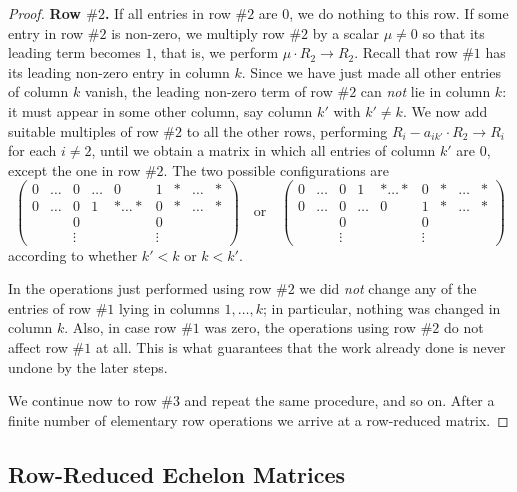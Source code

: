 \begin{proof}
\textbf{Row $\#2$.} If all entries in row $\#2$ are $0$, we do nothing to this row. If some entry in row $\#2$ is non-zero, we multiply row $\#2$ by a scalar $\mu \ne 0$ so that its leading term becomes $1$, that is, we perform $\mu \cdot R_2 \to R_2$. Recall that row $\#1$ has its leading non-zero entry in column $k$. Since we have just made all other entries of column $k$ vanish, the leading non-zero term of row $\#2$ can \emph{not} lie in column $k$: it must appear in some other column, say column $k'$ with $k' \ne k$. We now add suitable multiples of row $\#2$ to all the other rows, performing $R_i - a_{ik'} \cdot R_2 \to R_i$ for each $i \ne 2$, until we obtain a matrix in which all entries of column $k'$ are $0$, except the one in row $\#2$. The two possible configurations are
\[
\begin{pmatrix}
0 & \dots & 0 & \dots & 0 & 1 & \ast & \dots & \ast \\
0 & \dots & 0 & 1 & \ast \dots \ast & 0 & \ast & \dots & \ast \\
& & 0 & & & 0 & & & \\
& & \vdots & & & \vdots & & &
\end{pmatrix}
\quad \text{or} \quad
\begin{pmatrix}
0 & \dots & 0 & 1 & \ast \dots \ast & 0 & \ast & \dots & \ast \\
0 & \dots & 0 & \dots & 0 & 1 & \ast & \dots & \ast \\
& & 0 & & & 0 & & & \\
& & \vdots & & & \vdots & & &
\end{pmatrix}
\]
according to whether $k' < k$ or $k < k'$.

\begin{importantremark}
\label{rem:row_reduction_does_not_undo}
In the operations just performed using row $\#2$ we did \emph{not} change any of the entries of row $\#1$ lying in columns $1, \dots, k$; in particular, nothing was changed in column $k$. Also, in case row $\#1$ was zero, the operations using row $\#2$ do not affect row $\#1$ at all. This is what guarantees that the work already done is never undone by the later steps.
\end{importantremark}

We continue now to row $\#3$ and repeat the same procedure, and so on. After a finite number of elementary row operations we arrive at a row-reduced matrix.
\end{proof}

\subsection{Row-Reduced Echelon Matrices}

